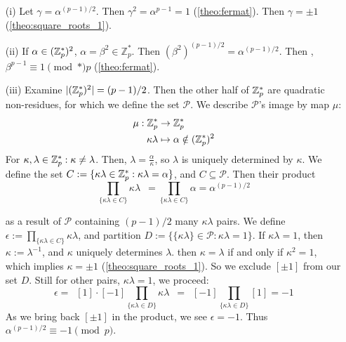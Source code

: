 \begin{Proof}

    \begin{enumerate}
        \item [(i)] Let $\gamma=\alpha^{(p-1)/2}$. Then $\gamma^2=\alpha^{p-1}=1$ (\ref{theo:fermat}). Then $\gamma=\pm1$ (\ref{theo:square_roots_1}).
        \item[(ii)] If $\alpha\in(\mathbb{Z}_p^*)^2$, $\alpha=\beta^2\in\mathbb{Z}_p^*$. Then $(\beta^2)^{(p-1)/2}=\alpha^{(p-1)/2}$.
        Then , $\beta^{p-1}\equiv 1 \pmod*{p}$ (\ref{theo:fermat}).
        \item[(iii)] Examine $|(\mathbb{Z}_p^*)^2|=(p-1)/2$. Then the other half of $\mathbb{Z}_p^*$ are quadratic non-residues, for which we define the set $\mathcal{P}$.
                     We describe $\mathcal{P}$'s image by map $\mu$:
                        \begin{align*}
                            \mu: \mathbb{Z}_p^* &\to \mathbb{Z}_p^*\\
                            \kappa\lambda &\mapsto \alpha\notin(\mathbb{Z}_p^*)^2
                        \end{align*}
                        For $\kappa,\lambda\in\mathbb{Z}_p^*:\kappa\neq\lambda$. Then, $\lambda=\frac{\alpha}{\kappa}$, so $\lambda$ is uniquely determined by $\kappa$.
                        We define the set $C:=\{\kappa\lambda\in\mathbb{Z}_p^*:\kappa\lambda=\alpha\}$, and $C\subseteq\mathcal{P}$. Then their product
                        \[\prod_{\{\kappa\lambda\in C\}}\kappa\lambda\enspace=\prod_{\{\kappa\lambda\in C\}}\alpha=\alpha^{(p-1)/2}\]

                        as a result of $\mathcal{P}$ containing $(p-1)/2$ many $\kappa\lambda$ pairs. We define $\epsilon:=\prod_{\{\kappa\lambda\in C\}}\kappa\lambda$,
                        and partition $D:=\{\{\kappa\lambda\}\in\mathcal{P}:\kappa\lambda=1\}$. If $\kappa\lambda=1$, then $\kappa:=\lambda^{-1}$, and $\kappa$ uniquely determines $\lambda$.
                        then $\kappa=\lambda$ if and only if $\kappa^2=1$, which implies $\kappa=\pm1$ (\ref{theo:square_roots_1}). So we exclude $[\pm1]$ from our set $D$. Still for other pairs, $\kappa\lambda=1$, we proceed:
                        \[\epsilon=\enspace[1]\cdot[-1]\prod_{\{\kappa\lambda\in D\}}\kappa\lambda\enspace=\enspace[-1]\prod_{\{\kappa\lambda\in D\}}[1]=-1\]
                        As we bring back $[\pm1]$ in the product, we see $\epsilon=-1$. Thus $\alpha^{(p-1)/2}\equiv -1\pmod{p}$.
    \end{enumerate} 

\end{Proof}
